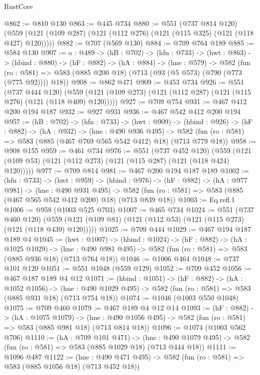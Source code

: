 \begin{lexlean}{RustCore}
\begin{coremodule}
@862 := @810 @130
@863 := @445 @734
@880 := @551
    (@737 @814 @120)
    (@559 (@121 (@109 @287) (@121 (@112 @276) (@121 (@115 @325) (@121 (@118 @427) @120)))))
@882 := @707 (@569 @130)
@884 := @709 @764 @189
@885 := @584 @130
@907 := {o : @489} ->
  (hB : @702) ->
  (hfn : @733) ->
  (hwt : @863) ->
  (hbind : @880) ->
  (hF : @882) ->
  (hA : @884) ->
  (hne : @579) ->
  @582 (fun (ro : @581) => @583 (@885 @200 @18) (@713 (@93 (@5 @573) (@790 (@773 (@775 @92)))) @18))
@908 := @862 @471
@909 := @453 @734
@926 := @551
    (@737 @444 @120)
    (@559 (@121 (@109 @273) (@121 (@112 @287) (@121 (@115 @276) (@121 (@118 @409) @120)))))
@927 := @709 @754
@931 := @467 @412 @200 @194 @187
@932 := @927 @931
@936 := @467 @542 @412 @200 @194
@957 := (hB : @702) ->
  (hfn : @733) ->
  (hwt : @909) ->
  (hbind : @926) ->
  (hF : @882) ->
  (hA : @932) ->
  (hne : @490 @936 @495) ->
  @582 (fun (ro : @581) => @583 (@885 (@467 @769 @565 @542 @412) @18) (@713 @779 @18))
@958 := @908 @155
@959 := @461 @734
@976 := @551
    (@737 @452 @120)
    (@559 (@121 (@109 @53) (@121 (@112 @273) (@121 (@115 @287) (@121 (@118 @424) @120)))))
@977 := @709 @814
@981 := @467 @200 @194 @187 @189
@1002 := (hfn : @733) ->
  (hwt : @959) ->
  (hbind : @976) ->
  (hF : @882) ->
  (hA : @977 @981) ->
  (hne : @490 @931 @495) ->
  @582 (fun (ro : @581) => @583 (@885 (@467 @565 @542 @412 @200) @18) (@713 @839 @18))
@1003 := Eq.refl.{1}
@1006 := @958 (@1003 @525 @703)
@1007 := @465 @734
@1024 := @551
    (@737 @460 @120)
    (@559 (@121 (@109 @81) (@121 (@112 @53) (@121 (@115 @273) (@121 (@118 @439) @120)))))
@1025 := @709 @444
@1029 := @467 @194 @187 @189 @4
@1045 := (hwt : @1007) ->
  (hbind : @1024) ->
  (hF : @882) ->
  (hA : @1025 @1029) ->
  (hne : @490 @981 @495) -> @582 (fun (ro : @581) => @583 (@885 @936 @18) (@713 @764 @18))
@1046 := @1006 @464
@1048 := @737 @101 @120
@1051 := @551 @1048 (@559 @129)
@1052 := @709 @452
@1056 := @467 @187 @189 @4 @12
@1071 := (hbind : @1051) ->
  (hF : @882) ->
  (hA : @1052 @1056) ->
  (hne : @490 @1029 @495) -> @582 (fun (ro : @581) => @583 (@885 @931 @18) (@713 @754 @18))
@1074 := @1046 (@1003 @550 @1048)
@1075 := @709 @460
@1079 := @467 @189 @4 @12 @14
@1093 := (hF : @882) ->
  (hA : @1075 @1079) ->
  (hne : @490 @1056 @495) -> @582 (fun (ro : @581) => @583 (@885 @981 @18) (@713 @814 @18))
@1096 := @1074 (@1003 @562 @706)
@1110 := (hA : @709 @101 @471) ->
  (hne : @490 @1079 @495) -> @582 (fun (ro : @581) => @583 (@885 @1029 @18) (@713 @444 @18))
@1111 := @1096 @487
@1122 := (hne : @490 @471 @495) -> @582 (fun (ro : @581) => @583 (@885 @1056 @18) (@713 @452 @18))

\end{coremodule}
\end{lexlean}
